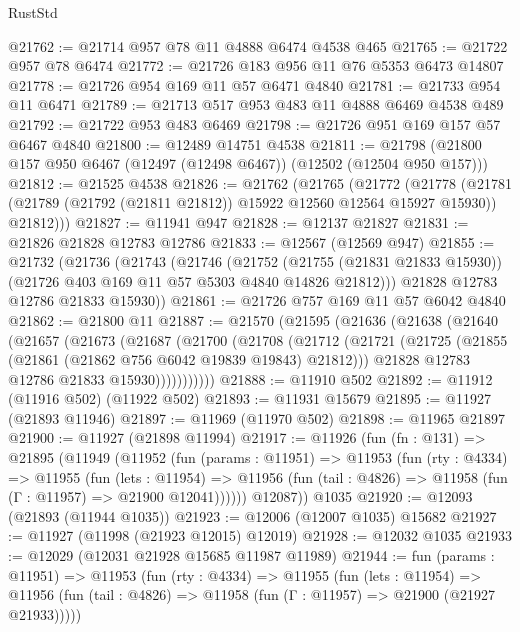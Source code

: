 \begin{lexlean}{RustStd}
\begin{coremodule}
@21762 := @21714 @957 @78 @11 @4888 @6474 @4538 @465
@21765 := @21722 @957 @78 @6474
@21772 := @21726 @183 @956 @11 @76 @5353 @6473 @14807
@21778 := @21726 @954 @169 @11 @57 @6471 @4840
@21781 := @21733 @954 @11 @6471
@21789 := @21713 @517 @953 @483 @11 @4888 @6469 @4538 @489
@21792 := @21722 @953 @483 @6469
@21798 := @21726 @951 @169 @157 @57 @6467 @4840
@21800 := @12489 @14751 @4538
@21811 := @21798 (@21800 @157 @950 @6467 (@12497 (@12498 @6467)) (@12502 (@12504 @950 @157)))
@21812 := @21525 @4538
@21826 := @21762
    (@21765
      (@21772
        (@21778
          (@21781 (@21789 (@21792 (@21811 @21812)) @15922 @12560 @12564 @15927 @15930))
          @21812)))
@21827 := @11941 @947
@21828 := @12137 @21827
@21831 := @21826 @21828 @12783 @12786
@21833 := @12567 (@12569 @947)
@21855 := @21732
    (@21736
      (@21743
        (@21746
          (@21752
            (@21755 (@21831 @21833 @15930))
            (@21726 @403 @169 @11 @57 @5303 @4840 @14826 @21812)))
        @21828
        @12783
        @12786
        @21833
        @15930))
@21861 := @21726 @757 @169 @11 @57 @6042 @4840
@21862 := @21800 @11
@21887 := @21570
    (@21595
      (@21636
        (@21638
          (@21640
            (@21657
              (@21673
                (@21687
                  (@21700
                    (@21708
                      (@21712
                        (@21721
                          (@21725 (@21855 (@21861 (@21862 @756 @6042 @19839 @19843) @21812)))
                          @21828
                          @12783
                          @12786
                          @21833
                          @15930)))))))))))
@21888 := @11910 @502
@21892 := @11912 (@11916 @502) (@11922 @502)
@21893 := @11931 @15679
@21895 := @11927 (@21893 @11946)
@21897 := @11969 (@11970 @502)
@21898 := @11965 @21897
@21900 := @11927 (@21898 @11994)
@21917 := @11926
    (fun (fn : @131) =>
    @21895
      (@11949
        (@11952
          (fun (params : @11951) =>
          @11953
            (fun (rty : @4334) =>
            @11955
              (fun (lets : @11954) =>
              @11956 (fun (tail : @4826) => @11958 (fun (Γ : @11957) => @21900 @12041))))))
        @12087))
    @1035
@21920 := @12093 (@21893 (@11944 @1035))
@21923 := @12006 (@12007 @1035) @15682
@21927 := @11927 (@11998 (@21923 @12015) @12019)
@21928 := @12032 @1035
@21933 := @12029 (@12031 @21928 @15685 @11987 @11989)
@21944 := fun (params : @11951) =>
  @11953
    (fun (rty : @4334) =>
    @11955
      (fun (lets : @11954) =>
      @11956 (fun (tail : @4826) => @11958 (fun (Γ : @11957) => @21900 (@21927 @21933)))))

\end{coremodule}
\end{lexlean}
